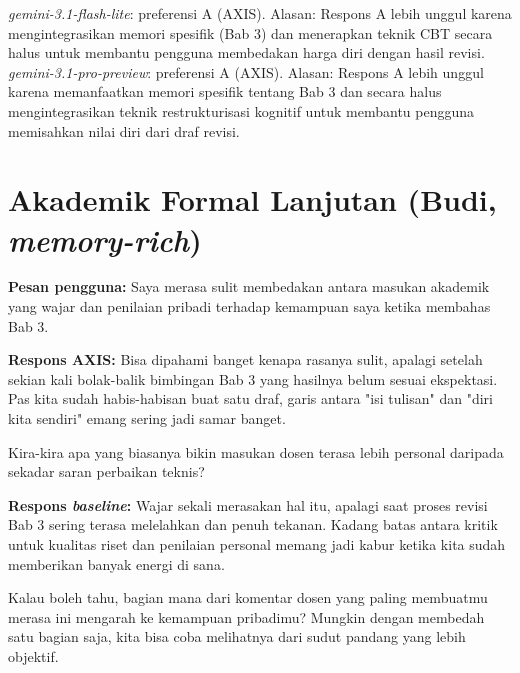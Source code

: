 \textit{gemini-3.1-flash-lite}: preferensi A (AXIS). Alasan: Respons A lebih unggul karena mengintegrasikan memori spesifik (Bab 3) dan menerapkan teknik CBT secara halus untuk membantu pengguna membedakan harga diri dengan hasil revisi.\newline
\textit{gemini-3.1-pro-preview}: preferensi A (AXIS). Alasan: Respons A lebih unggul karena memanfaatkan memori spesifik tentang Bab 3 dan secara halus mengintegrasikan teknik restrukturisasi kognitif untuk membantu pengguna memisahkan nilai diri dari draf revisi.\newline

\section{Akademik Formal Lanjutan (Budi, \textit{memory-rich})}

\textbf{Pesan pengguna:} Saya merasa sulit membedakan antara masukan akademik yang wajar dan penilaian pribadi terhadap kemampuan saya ketika membahas Bab 3.

\textbf{Respons AXIS:} Bisa dipahami banget kenapa rasanya sulit, apalagi setelah sekian kali bolak-balik bimbingan Bab 3 yang hasilnya belum sesuai ekspektasi. Pas kita sudah habis-habisan buat satu draf, garis antara "isi tulisan" dan "diri kita sendiri" emang sering jadi samar banget.

Kira-kira apa yang biasanya bikin masukan dosen terasa lebih personal daripada sekadar saran perbaikan teknis?

\textbf{Respons \textit{baseline}:} Wajar sekali merasakan hal itu, apalagi saat proses revisi Bab 3 sering terasa melelahkan dan penuh tekanan. Kadang batas antara kritik untuk kualitas riset dan penilaian personal memang jadi kabur ketika kita sudah memberikan banyak energi di sana.

Kalau boleh tahu, bagian mana dari komentar dosen yang paling membuatmu merasa ini mengarah ke kemampuan pribadimu? Mungkin dengan membedah satu bagian saja, kita bisa coba melihatnya dari sudut pandang yang lebih objektif.

